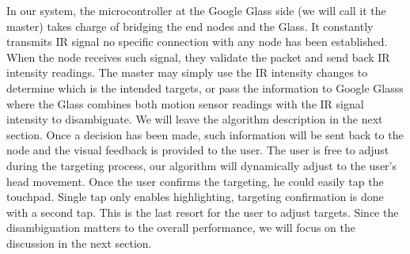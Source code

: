 In our system, the microcontroller at the Google Glass side (we will call it the master) takes charge of bridging the end nodes and the Glass. It constantly transmits IR signal no specific connection with any node has been established. When the node receives such signal, they validate the packet and send back IR intensity readings. The master may simply use the IR intensity changes to determine which is the intended targets, or pass the information to Google Glasss where the Glass combines both motion sensor readings with the IR signal intensity to disambiguate. We will leave the algorithm description in the next section. Once a decision has been made, such information will be sent back to the node and the visual feedback is provided to the user. The user is free to adjust during the targeting process, our algorithm will dynamically adjust to the user's head movement. Once the user confirms the targeting, he could easily tap the touchpad. Single tap only enables highlighting, targeting confirmation is done with a second tap. This is the last resort for the user to adjust targets. Since the disambiguation matters to the overall performance, we will focus on the discussion in the next section.

